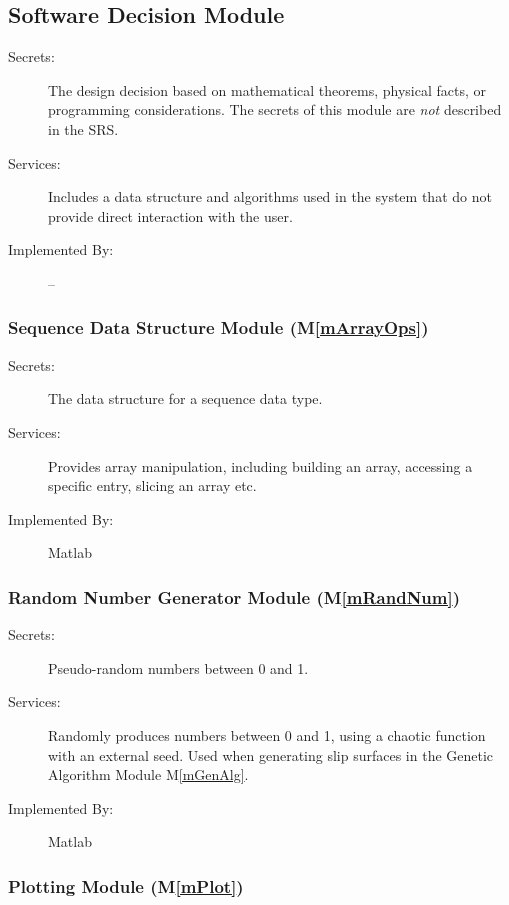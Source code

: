 \documentclass[12pt, titlepage]{article}
\newcommand{\mref}[1]{M\ref{#1}}
\begin{document}
\subsection{Software Decision Module}

\begin{description}
\item[Secrets:] The design decision based on mathematical theorems,
  physical facts, or programming considerations. The secrets of this
  module are \emph{not} described in the SRS.
\item[Services:] Includes a data structure and algorithms used in the
  system that do not provide direct interaction with the user.
\item[Implemented By:] --
\end{description}


\subsubsection{Sequence Data Structure Module (\mref{mArrayOps})}

\begin{description}
\item[Secrets:] The data structure for a sequence data type.
\item[Services:] Provides array manipulation, including building an
  array, accessing a specific entry, slicing an array etc.
\item[Implemented By:] Matlab
\end{description}


\subsubsection{Random Number Generator Module (\mref{mRandNum})}

\begin{description}
\item[Secrets:] Pseudo-random numbers between 0 and 1.
\item[Services:] Randomly produces numbers between 0 and 1, using a
  chaotic function with an external seed. Used when generating slip
  surfaces in the Genetic Algorithm Module \mref{mGenAlg}.
\item[Implemented By:] Matlab
\end{description}


\subsubsection{Plotting Module (\mref{mPlot})}
\end{document}

